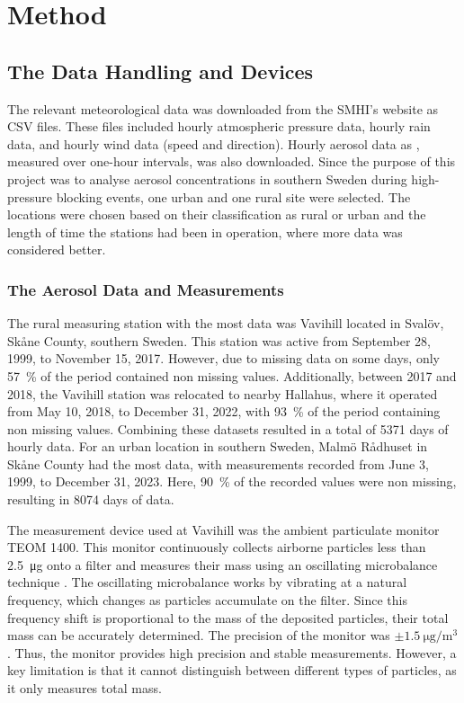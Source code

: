 \newpage
\section{Method}
\subsection{The Data Handling and Devices}
The relevant meteorological data was downloaded from the SMHI’s website as CSV files. These files included hourly atmospheric pressure data, hourly rain data, and hourly wind data (speed and direction). Hourly aerosol data as \PM, measured over one-hour intervals, was also downloaded. Since the purpose of this project was to analyse aerosol concentrations in southern Sweden during high-pressure blocking events, one urban and one rural site were selected. The locations were chosen based on their classification as rural or urban and the length of time the stations had been in operation, where more data was considered better. 

\subsubsection{The Aerosol Data and Measurements}
The rural measuring station with the most data was Vavihill located in Svalöv, Skåne County, southern Sweden. This station was active from September 28, 1999, to November 15, 2017. However, due to missing data on some days, only \SI{57}{\%} of the period contained non missing values. Additionally, between 2017 and 2018, the Vavihill station was relocated to nearby Hallahus, where it operated from May 10, 2018, to December 31, 2022, with \SI{93}{\%} of the period containing non missing values. Combining these datasets resulted in a total of \SI{5371}{} days of hourly data. For an urban location in southern Sweden, Malmö Rådhuset in Skåne County had the most data, with measurements recorded from June 3, 1999, to December 31, 2023. Here, \SI{90}{\%} of the recorded values were non missing, resulting in \SI{8074}{} days of data. 

The measurement device used at Vavihill was the ambient particulate monitor TEOM 1400. This monitor continuously collects airborne particles less than \SI{2.5}{\micro\g} onto a filter and measures their mass using an oscillating microbalance technique \cite{thermofisherscientificinc.TEOMSeries1400a2007}. The oscillating microbalance works by vibrating at a natural frequency, which changes as particles accumulate on the filter. Since this frequency shift is proportional to the mass of the deposited particles, their total mass can be accurately determined. The precision of the monitor was $\pm\SI{1.5}{\micro\gram\per\meter\cubed}$. Thus, the monitor provides high precision and stable measurements. However, a key limitation is that it cannot distinguish between different types of particles, as it only measures total mass.


